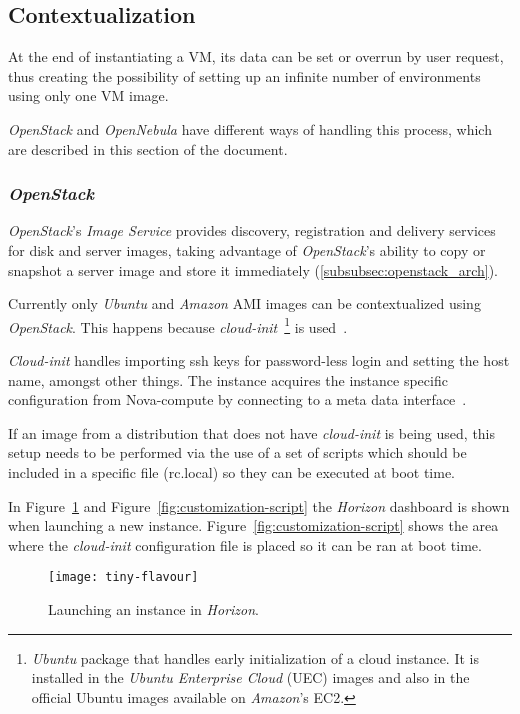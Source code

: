 \subsection{Contextualization}\label{subsec:contextualization}

At the end of instantiating a VM, its data can be set or overrun by user request, thus creating the possibility of setting up an infinite number of environments using only one VM image.

\textit{OpenStack} and \textit{OpenNebula} have different ways of handling this process, which are described in this section of the document.

\subsubsection{\textit{OpenStack}}

\textit{OpenStack}'s \textit{Image Service} provides discovery, registration and delivery services for disk and server images, taking advantage of \textit{OpenStack}'s ability to copy or snapshot a server image and store it immediately (\ref{subsubsec:openstack_arch}).

Currently only \textit{Ubuntu} and \textit{Amazon} AMI images can be contextualized using \textit{OpenStack}. This happens because \textit{cloud-init}~\footnote{\textit{Ubuntu} package that handles early initialization of a cloud instance. It is installed in the \textit{Ubuntu Enterprise Cloud} (UEC) images and also in the official Ubuntu images available on \textit{Amazon}'s EC2.} is used~\cite{essex-cloudinit}.

\textit{Cloud-init} handles importing ssh keys for password-less login and setting the host name, amongst other things. The instance acquires the instance specific configuration from Nova-compute by connecting to a meta data interface~\cite{essex-cloudinit}.

If an image from a distribution that does not have \textit{cloud-init} is being used, this setup needs to be performed via the use of a set of scripts which should be included in a specific file (rc.local) so they can be executed at boot time.

In Figure~\ref{fig:tiny-flavour} and Figure~\ref{fig:customization-script} the \textit{Horizon} dashboard is shown when launching a new instance. Figure~\ref{fig:customization-script} shows the area where the \textit{cloud-init} configuration file is placed so it can be ran at boot time.

\begin{figure}[h!]
  \begin{center}
    \leavevmode
    \texttt{[image: tiny-flavour]}
    \caption{Launching an instance in \textit{Horizon}.}
    \label{fig:tiny-flavour}
  \end{center} 
\end{figure}


